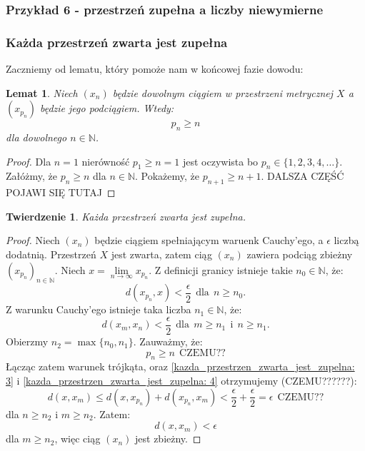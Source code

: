 \documentclass{article}
\newtheorem*{theorem}{Twierdzenie}
\newtheorem{lemma}{Lemat}
\begin{document}
\subsubsection{Przykład 6 - przestrzeń zupełna a liczby niewymierne}
\subsubsection{Każda przestrzeń zwarta jest zupełna}
Zaczniemy od lematu, który pomoże nam w końcowej fazie dowodu:
\begin{lemma}
    Niech \((x_n)\) będzie dowolnym ciągiem w przestrzeni metrycznej \(X\) a \((x_{p_{n}})\) będzie jego podciągiem.
    Wtedy:
    \begin{equation*}
        p_n \geq n
    \end{equation*}
    dla dowolnego \(n \in \mathbb{N}\).
\end{lemma}
\begin{proof}
    Dla \(n = 1\) nierówność \(p_1 \geq n = 1\) jest oczywista bo \(p_n \in \{1, 2, 3, 4, \dots\}\).
    Załóżmy, że  \(p_n \geq n\) dla \(n \in \mathbb{N}\). Pokażemy, że \(p_{n + 1} \geq n + 1\).
    DALSZA CZĘŚĆ POJAWI SIĘ TUTAJ
\end{proof}
\begin{theorem}
    Każda przestrzeń zwarta jest zupełna.
\end{theorem}
\begin{proof}
    Niech \((x_n)\) będzie ciągiem spełniającym waruenk Cauchy'ego, a \(\epsilon\) liczbą dodatnią. Przestrzeń \(X\) jest
    zwarta, zatem ciąg \((x_n)\) zawiera podciąg zbieżny \((x_{p_n})_{n \in \mathbb{N}}\). 
    Niech \( x = \lim\limits_{n \to \infty} x_{p_n}\). Z definicji granicy istnieje takie \(n_0 \in \mathbb{N}\), że:
    \begin{equation} \label{kazda_przestrzen_zwarta_jest_zupelna: 3}
        d(x_{p_n}, x) < \frac{\epsilon}{2} \ \ \mbox{dla} \ \ n \geq n_0.
    \end{equation}
    Z warunku Cauchy'ego istnieje taka liczba \(n_1 \in \mathbb{N}\), że:
    \begin{equation} \label{kazda_przestrzen_zwarta_jest_zupelna: 4}
        d(x_m , x_n) < \frac{\epsilon}{2} \ \ \mbox{dla} \ \ m \geq n_1 \ \ \mbox{i} \ \ n \geq n_1.
    \end{equation}
    Obierzmy \(n_2 = \max\{n_0 , n_1\}\). Zauważmy, że:
    \begin{equation*} 
        p_n \geq n \ \ \mbox{CZEMU??}
    \end{equation*}
    Łącząc zatem warunek trójkąta, oraz \eqref{kazda_przestrzen_zwarta_jest_zupelna: 3}
    i \eqref{kazda_przestrzen_zwarta_jest_zupelna: 4} otrzymujemy (CZEMU??????):
    \begin{equation*}
        d(x, x_m) \leq d(x, x_{p_n}) + d(x_{p_n}, x_m) < \frac{\epsilon}{2} + \frac{\epsilon}{2} = \epsilon \ \ \mbox{CZEMU??}
    \end{equation*}
    dla \(n \geq n_2\) i \(m \geq n_2\). Zatem:
    \begin{equation*}
        d(x, x_{m}) < \epsilon
    \end{equation*}
    dla \(m \geq n_2\), więc ciąg \((x_n)\) jest zbieżny.
\end{proof}
\end{document}
